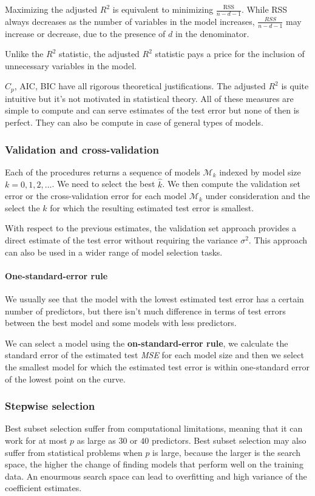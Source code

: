 Maximizing the adjusted $R^2$ is equivalent to minimizing $\frac{\text{RSS}}{n-d-1}$. While RSS always decreases as the number of variables in the model increases, $\frac{RSS}{n-d-1}$ may increase or decrease, due to the presence of $d$ in the denominator.

Unlike the $R^2$ statistic, the adjusted $R^2$ statistic pays a price for the inclusion of unnecessary variables in the model.

$C_p$, AIC, BIC have all rigorous theoretical justifications. The adjusted $R^2$ is quite intuitive but it's not motivated in statistical theory. All of these measures are simple to compute and can serve estimates of the test error but none of then is perfect. They can also be compute in case of general types of models.

\subsubsection*{Validation and cross-validation}

Each of the procedures returns a sequence of models $\mathcal{M}_k$ indexed by model size $k = 0,1,2,\dots$. We need to select the best $\hat{k}$.
We then compute the validation set error or the cross-validation error for each model $\mathcal{M}_k$ under consideration and the select the $k$ for which the resulting estimated test error is smallest.

With respect to the previous estimates, the validation set approach provides a direct estimate of the test error without requiring the variance $\sigma^2$. This approach can also be used in a wider range of model selection tasks.

\paragraph*{One-standard-error rule}
We usually see that the model with the lowest estimated test error has a certain number of predictors, but there isn't much difference in terms of test errors between the best model and some models with less predictors.

We can select a model using the \textbf{on-standard-error rule}, we calculate the standard error of the estimated test \textit{MSE} for each model size and then we select the smallest model for which the estimated test error is within one-standard error of the lowest point on the curve.

\subsubsection*{Stepwise selection}
Best subset selection suffer from computational limitations, meaning that it can work for at most $p$ as large as $30$ or $40$ predictors.
Best subset selection may also suffer from statistical problems when $p$ is large, because the larger is the search space, the higher the change of finding models that perform well on the training data. An enourmous search space can lead to overfitting and high variance of the coefficient estimates.

